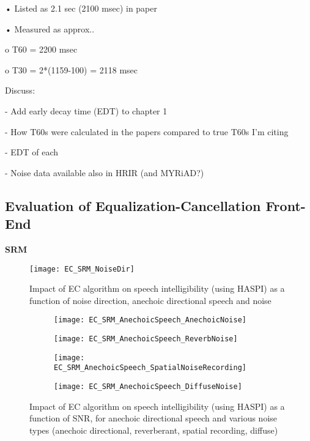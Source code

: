 •	Listed as 2.1 sec (2100 msec) in paper

•	Measured as approx..

o	T60 = 2200 msec

o	T30 = 2*(1159-100) = 2118 msec


Discuss:

- Add early decay time (EDT) to  chapter 1

- How T60s were calculated in the papers compared to true T60s I'm citing

- EDT of each

- Noise data available also in HRIR (and MYRiAD?)

\subsection{Evaluation of Equalization-Cancellation Front-End}

\textbf{SRM}

\begin{figure}[H]
	\texttt{[image: EC\_SRM\_NoiseDir]}
	\centering
	\caption{Impact of EC algorithm on speech intelligibility (using HASPI) as a function of noise direction, anechoic directional speech and noise}
	\label{fig:EC_SRM_NoiseDir}
\end{figure}

\begin{figure}[H]
	\centering
	\begin{subfigure}[b]{0.49\textwidth}
		\centering
		\texttt{[image: EC\_SRM\_AnechoicSpeech\_AnechoicNoise]}
	\end{subfigure}
	\hfill
	\begin{subfigure}[b]{0.49\textwidth}
		\centering
		\texttt{[image: EC\_SRM\_AnechoicSpeech\_ReverbNoise]}
	\end{subfigure}
	\hfill
	\begin{subfigure}[b]{0.49\textwidth}
		\centering
		\texttt{[image: EC\_SRM\_AnechoicSpeech\_SpatialNoiseRecording]}
	\end{subfigure}
	\hfill
	\begin{subfigure}[b]{0.49\textwidth}
		\centering
		\texttt{[image: EC\_SRM\_AnechoicSpeech\_DiffuseNoise]}
	\end{subfigure}
	\hfill
	\caption{Impact of EC algorithm on speech intelligibility (using HASPI) as a function of SNR, for anechoic directional speech and various noise types (anechoic directional, reverberant, spatial recording, diffuse)}
	\label{fig:EC_SRM_AnechoicSpeech}
\end{figure}


